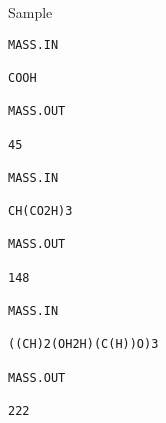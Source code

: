 Sample
\begin{verbatim}
MASS.IN

COOH

MASS.OUT

45
 
MASS.IN

CH(CO2H)3

MASS.OUT

148
 
MASS.IN

((CH)2(OH2H)(C(H))O)3

MASS.OUT

222
 

\end{verbatim}